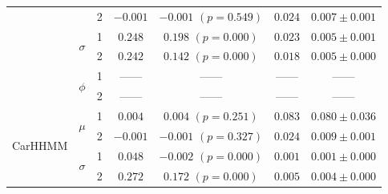 \documentclass{article}
\begin{document}
\begin{center}
{\begin{tabular}{ccccccc}
                                    &                               & 2                                & $-0.001$                        & $-0.001$ $(p=0.549)$         & $0.024$                             & $0.007 \pm 0.001$                             \\
                                    & \multirow{2}{*}{$\sigma$}     & 1                                & $0.248$                         & $0.198$ $(p=0.000)$          & $0.023$                             & $0.005 \pm 0.001$                             \\
                                    &                               & 2                                & $0.242$                         & $0.142$ $(p=0.000)$          & $0.018$                             & $0.005 \pm 0.000$                             \\ 
                                    & \multirow{2}{*}{$\phi$}       & 1                                & ------                          & ------                       & ------                              & ------                                        \\
                                    &                               & 2                                & ------                          & ------                       & ------                              & ------                                        \\ \hline
        \multirow{6}{*}{CarHHMM}    & \multirow{2}{*}{$\mu$}        & 1                                & $0.004$                         & $0.004$ $(p=0.251)$          & $0.083$                             & $0.080 \pm 0.036$                             \\
                                    &                               & 2                                & $-0.001$                        & $-0.001$ $(p=0.327)$         & $0.024$                             & $0.009 \pm 0.001$                             \\
                                    & \multirow{2}{*}{$\sigma$}     & 1                                & $0.048$                         & $-0.002$ $(p=0.000)$         & $0.001$                             & $0.001 \pm 0.000$                             \\
                                    &                               & 2                                & $0.272$                         & $0.172$ $(p=0.000)$          & $0.005$                             & $0.004 \pm 0.000$                             \\ 

\end{tabular}}
\end{center}
\end{document}
